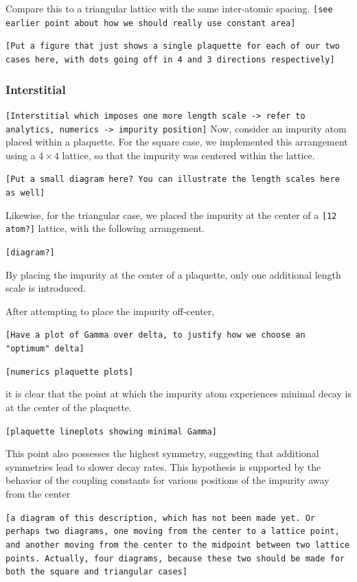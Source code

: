 \documentclass[aps,pra,superscriptaddress,twocolumn]{revtex4-1}
\newcommand{\commentSB}[1]{\texttt{\color{blue}[#1]}}
\newcommand{\commentSO}[1]{\texttt{\color{orange}[#1]}}
\newcommand{\commentTP}[1]{\texttt{\color{green}[#1]}}
\begin{document}
Compare this to a triangular lattice with the same inter-atomic spacing. 
\commentSB{see earlier point about how we should really use constant area}

\commentTP{Put a figure that just shows a single plaquette for each of our two cases here, with dots going off in 4 and 3 directions respectively}

\subsubsection{Interstitial}
\commentSO{Interstitial which imposes one more length scale -> refer to analytics, numerics -> impurity position}
Now, consider an impurity atom placed within a plaquette. For the square case, we implemented this arrangement using a $4\times 4$ lattice, so that the impurity was centered within the lattice. 

\commentSB{Put a small diagram here? You can illustrate the length scales here as well}

Likewise, for the triangular case, we placed the impurity at the center of a \commentSB{12 atom?} lattice, with the following arrangement. 

\commentSB{diagram?}

By placing the impurity at the center of a plaquette, only one additional length scale is introduced. 



After attempting to place the impurity off-center, 

\commentTP{Have a plot of Gamma over delta, to justify how we choose an "optimum" delta}

\commentSB{numerics plaquette plots}

it is clear that the point at which the impurity atom experiences minimal decay is at the center of the plaquette. 

\commentSB{plaquette lineplots showing minimal Gamma}

This point also possesses the highest symmetry, suggesting that additional symmetries lead to slower decay rates. This hypothesis is supported by the behavior of the coupling constants for various positions of the impurity away from the center 

\commentSB{a diagram of this description, which has not been made yet. Or perhaps two diagrams, one moving from the center to a lattice point, and another moving from the center to the midpoint between two lattice points. Actually, four diagrams, because these two should be made for both the square and triangular cases}
\end{document}
